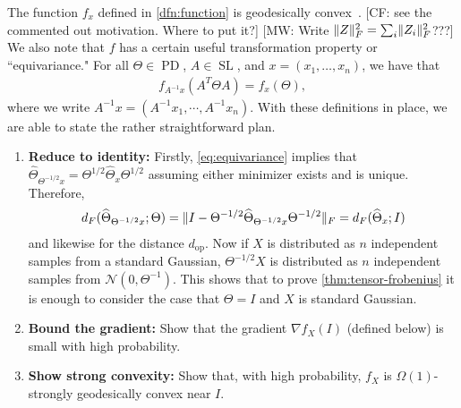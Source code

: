 \documentclass{article}
\DeclarePairedDelimiter{\norm}{\lVert}{\rVert}
\newcommand{\op}{\operatorname{op}}
\renewcommand{\vec}{\bm}
\newcommand\cN{\mathcal{N}}
\newcommand\SL{\operatorname{SL}}
\newcommand\PD{\operatorname{PD}}
\newcommand\samp{x}
\newcommand\rv{X}
\newcommand\tr{\operatorname{Tr}}
\newcommand{\CF}[1]{{\color{purple}[CF: #1]}}
\newcommand{\MW}[1]{{\color{red}[MW: #1]}}
\begin{document}
The function $f_{\samp}$ defined in \cref{dfn:function} is geodesically convex~\cite{burgisser2019towards}. \CF{see the commented out motivation. Where to put it?}
\MW{Write $\norm Z_F^2 = \sum_i \norm{Z_i}_F^2$???}
We also note that $f$ has a certain useful transformation property or ``equivariance." For all $\Theta \in \PD$, $A \in \SL$, and $\samp=(\samp_1,\dots,\samp_n)$, we have that
\begin{align}\label{eq:equivariance}
  f_{A^{-1} \samp}(A^T \Theta A) = f_{\samp}(\Theta),
\end{align}
where we write $A^{-1} \samp = (A^{-1} \samp_1,\cdots,A^{-1} \samp_n)$.
With these definitions in place, we are able to state the rather straightforward plan.

\begin{enumerate}
\item\label{it:reduce} \textbf{Reduce to identity:}
Firstly, \cref{eq:equivariance} implies that $\widehat\Theta_{\Theta^{-1/2} \samp} = \Theta^{1/2} \widehat\Theta_{\samp} \Theta^{1/2}$ assuming either minimizer exists and is unique.
Therefore,
\begin{align*}
  d_F(\widehat\Theta_{\Theta^{-1/2} \samp}; \Theta)
= \norm{ I - \Theta^{-1/2} \widehat\Theta_{\Theta^{-1/2} \samp} \Theta^{-1/2} }_F
= d_F(\widehat\Theta_{\samp}; I)
\end{align*}
and likewise for the distance $d_{\op}$.
Now if $\rv$ is distributed as $n$ independent samples from a standard Gaussian, $\Theta^{-1/2} \rv$ is distributed as $n$ independent samples from $\cN(0, \Theta^{-1})$.
This shows that to prove \cref{thm:tensor-frobenius} it is enough to consider the case that $\Theta = I$ and $\rv$ is standard Gaussian.
\item\label{it:grad} \textbf{Bound the gradient:}
Show that the gradient $\nabla f_{\rv}(I)$ (defined below) is small with high probability.
\item\label{it:convexity} \textbf{Show strong convexity:}
Show that, with high probability, $f_{\rv}$ is $\Omega(1)$-strongly geodesically convex near $I$.
\end{enumerate}
\end{document}
